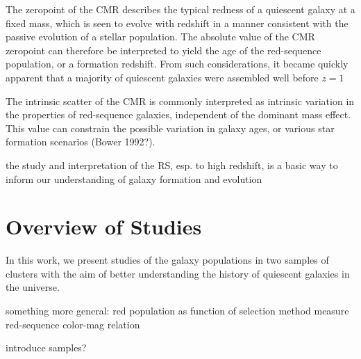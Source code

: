 The zeropoint of the CMR describes the typical redness of a quiescent galaxy at a fixed mass, which is seen to evolve with redshift in a manner consistent with the passive evolution of a stellar population.
The absolute value of the CMR zeropoint can therefore be interpreted to yield the age of the red-sequence population, or a formation redshift.
From such considerations, it became quickly apparent that a majority of quiescent galaxies were assembled well before $z=1$
\citep{Peebles:2002aa}

The intrinsic scatter of the CMR is commonly interpreted as intrinsic variation in the properties of red-sequence galaxies, independent of the dominant mass effect.
This value can constrain the possible variation in galaxy ages, or various star formation scenarios (Bower 1992?).



the study and interpretation of the RS, esp. to high redshift, is a basic way to inform our understanding of galaxy formation and evolution



\section{Overview of Studies}

In this work, we present studies of the galaxy populations in two samples of clusters with the aim of better understanding the history of quiescent galaxies in the universe.

something more general: red population as function of selection method
measure red-sequence color-mag relation

introduce samples?

